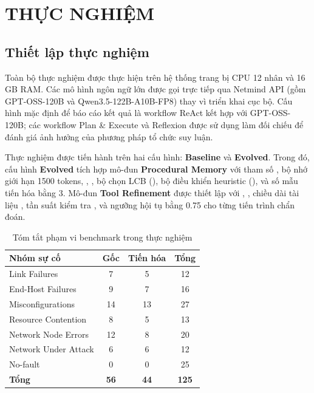 \section{THỰC NGHIỆM}

\subsection{Thiết lập thực nghiệm}

Toàn bộ thực nghiệm được thực hiện trên hệ thống trang bị CPU 12 nhân và 16 GB RAM. Các mô hình ngôn ngữ lớn được gọi trực tiếp qua Netmind API (gồm GPT-OSS-120B và Qwen3.5-122B-A10B-FP8) thay vì triển khai cục bộ. Cấu hình mặc định để báo cáo kết quả là workflow ReAct kết hợp với GPT-OSS-120B; các workflow Plan \& Execute và Reflexion được sử dụng làm đối chiếu để đánh giá ảnh hưởng của phương pháp tổ chức suy luận.

Thực nghiệm được tiến hành trên hai cấu hình: \textbf{Baseline} và \textbf{Evolved}. Trong đó, cấu hình \textbf{Evolved} tích hợp mô-đun \textbf{Procedural Memory} với tham số , bộ nhớ giới hạn 1500 tokens, , , bộ chọn LCB (), bộ điều khiển heuristic (),  và số mẫu tiến hóa bằng 3. Mô-đun \textbf{Tool Refinement} được thiết lập với , , chiều dài tài liệu , tần suất kiểm tra ,  và ngưỡng hội tụ bằng 0.75 cho từng tiến trình chẩn đoán.

\begin{table}[h]
\centering
\small
\caption{Tóm tắt phạm vi benchmark trong thực nghiệm}
\label{tab:benchmark_scope}
\begin{tabularx}{\columnwidth}{@{}Yccc@{}}
\toprule
\textbf{Nhóm sự cố} & \textbf{Gốc} & \textbf{Tiến hóa} & \textbf{Tổng} \\
\midrule
Link Failures        & 7  & 5  & 12 \\
End-Host Failures    & 9  & 7  & 16 \\
Misconfigurations    & 14 & 13 & 27 \\
Resource Contention  & 8  & 5  & 13 \\
Network Node Errors  & 12 & 8  & 20 \\
Network Under Attack & 6  & 6  & 12 \\
No-fault             & 0  & 0  & 25 \\
\midrule
\textbf{Tổng}        & \textbf{56} & \textbf{44} & \textbf{125} \\
\bottomrule
\end{tabularx}
\end{table}

